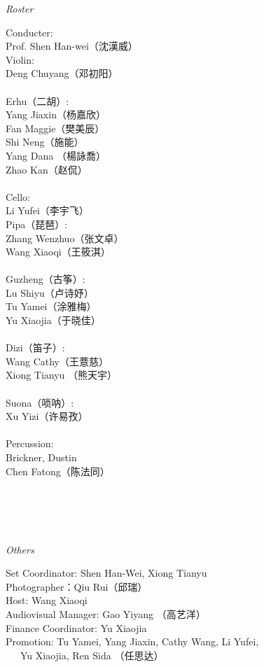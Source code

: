 \documentclass[letter,8pt,poets]{ConcProg}
\begin{document}
\begin{spacing}{1.0}
\begin{center}
\Large\textsl{ Roster}
\end{center}
\begin{multicols}{2}%
\begin{spacing}{1.5}
Conducter:\\
Prof. Shen  Han-wei（沈漢威）
\\
Violin:\\
Deng  Chuyang（邓初阳）\\
\\
Erhu（二胡）:     \\   
Yang  Jiaxin（杨嘉欣）\\  
Fan  Maggie（樊美辰）\\
Shi Neng（施能）\\
Yang  Dana （楊詠喬）\\
Zhao  Kan（赵侃）\\
\\
Cello:\\
Li  Yufei（李宇飞）\\

Pipa（琵琶）:\\
Zhang  Wenzhuo（张文卓）\\
Wang Xiaoqi（王筱淇）\\
\\
Guzheng（{古筝}）:\\
Lu  Shiyu（卢诗妤）\\
Tu  Yamei（涂雅梅）\\
Yu Xiaojia（于晓佳）
\\
\\
Dizi（笛子）: 				 \\
Wang  Cathy（王薏慈）\\
Xiong  Tianyu （熊天宇）\\
\\
Suona（唢呐）:\\
Xu  Yizi（许易孜）
\\
\\
Percussion:\\
Brickner, Dustin\\
Chen Fatong（陈法同）\\
\\
\\
\\
\\
\end{spacing}
\end{multicols}
\begin{center}
\Large\textsl{ Others}
\end{center}
\begin{multicols}{2}%
Set Coordinator: Shen Han-Wei, Xiong Tianyu\\ 
Photographer：Qiu Rui（邱瑞）\\
Host: Wang Xiaoqi \\
Audiovisual Manager: Gao Yiyang （高艺洋） \\
Finance Coordinator: Yu Xiaojia \\
Promotion: Tu Yamei, Yang Jiaxin, Cathy Wang, Li Yufei, \\ {\ \ \ }Yu Xiaojia, Ren Sida （任思达）



\end{multicols}
\end{spacing}
\end{document}
